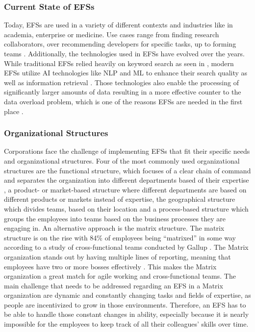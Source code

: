 \subsubsection{Current State of \aclp{EFS}}
Today, \acp{EFS} are used in a variety of different contexts and industries like in academia, enterprise or medicine. Use cases range from finding research collaborators, over recommending developers for specific tasks, up to forming teams \parencite[2,9]{husain_expert_2019}. Additionally, the technologies used in \acp{EFS} have evolved over the years. While traditional \acp{EFS} relied heavily on keyword search as seen in \textcite[4-5]{mattox_enterprise_1999}, modern \acp{EFS} utilize \ac{AI} technologies like \ac{NLP} and \ac{ML} to enhance their search quality as well as information retrieval \parencite[19-20]{husain_expert_2019}. Those technologies also enable the processing of significantly larger amounts of data resulting in a more effective counter to the data overload problem, which is one of the reasons \acp{EFS} are needed in the first place \parencite[1]{husain_expert_2019}.

\subsubsection{Organizational Structures}
Corporations face the challenge of implementing \acp{EFS} that fit their specific needs and organizational structures. Four of the most commonly used organizational structures are the functional structure, which focuses of a clear chain of command and separates the organization into different departments based of their expertise \parencite{noauthor_what_nodate-1}, a product- or market-based structure where different departments are based on different products or markets instead of expertise, the geographical structure which divides teams, based on their location and a process-based structure which groups the employees into teams based on the business processes they are engaging in. \parencite{organ_7_2023} An alternative approach is the matrix structure. The matrix structure is on the rise with 84\% of employees being “matrixed” in some way according to a study of cross-functional teams conducted by Gallup \parencite[page 65]{inc_state_nodate}. The Matrix organization stands out by having multiple lines of reporting, meaning that employees have two or more bosses effectively \parencite{noauthor_what_nodate, organ_7_2023}. This makes the Matrix organization a great match for agile working and cross-functional teams. The main challenge that needs to be addressed regarding an \ac{EFS} in a Matrix organization are dynamic and constantly changing tasks and fields of expertise, as people are incentivized to grow in those environments. Therefore, an \ac{EFS} has to be able to handle those constant changes in ability, especially because it is nearly impossible for the employees to keep track of all their colleagues’ skills over time. 

